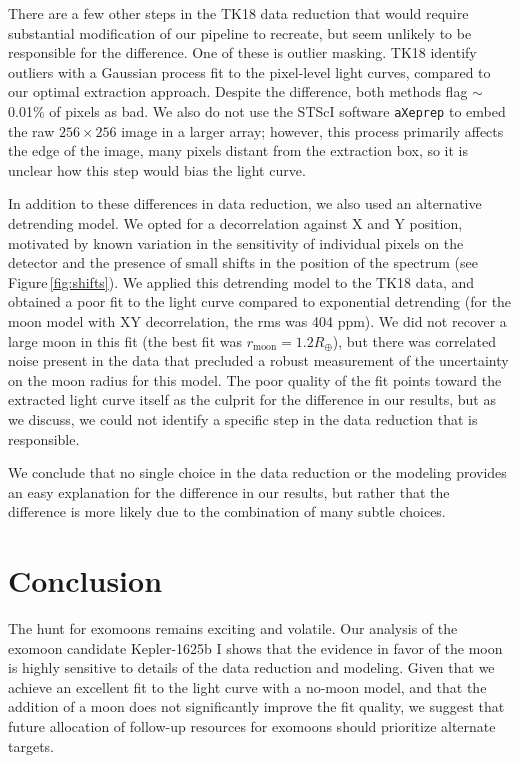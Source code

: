 \documentclass[twocolumn]{aastex62}
\begin{document}
There are a few other steps in the TK18 data reduction that would require substantial modification of our pipeline to recreate, but seem unlikely to be responsible for the difference. One of these is outlier masking. TK18 identify outliers with a Gaussian process fit to the pixel-level light curves, compared to our optimal extraction approach. Despite the difference, both methods flag $\sim$0.01\% of pixels as bad.  We also do not use the STScI software \texttt{aXeprep} to embed the raw $256\times256$ image in a larger array; however, this process primarily affects the edge of the image, many pixels distant from the extraction box, so it is unclear how this step would bias the light curve.
 
 
In addition to these differences in data reduction, we also used an alternative detrending model. We opted for a decorrelation against X and Y position, motivated by known variation in the sensitivity of individual pixels on the detector and the presence of small shifts in the position of the spectrum (see Figure\,\ref{fig:shifts}). We applied this detrending model to the TK18 data, and obtained a poor fit to the light curve compared to exponential detrending (for the moon model with XY decorrelation, the rms was 404 ppm). We did not recover a large moon in this fit (the best fit was $r_\mathrm{moon} = 1.2R_\oplus$), but there was correlated noise present in the data that precluded a robust measurement of the uncertainty on the moon radius for this model. The poor quality of the fit points toward the extracted light curve itself as the culprit for the difference in our results, but as we discuss, we could not identify a specific step in the data reduction that is responsible.

 We conclude that no single choice in the data reduction or the modeling provides an easy explanation for the difference in our results, but rather that the difference is more likely due to the combination of many subtle choices.

\section{Conclusion}
The hunt for exomoons remains exciting and volatile. Our analysis of the exomoon candidate Kepler-1625b I shows that the evidence in favor of the moon is highly sensitive to details of the data reduction and modeling. Given that we achieve an excellent fit to the light curve with a no-moon model, and that the addition of a moon does not significantly improve the fit quality, we suggest that future allocation of follow-up resources for exomoons should prioritize alternate targets.
\end{document}
